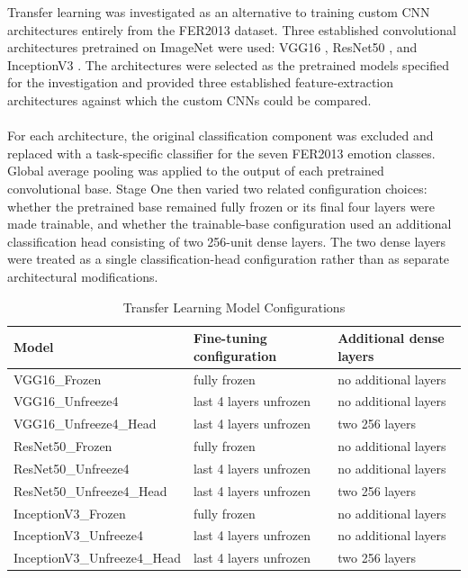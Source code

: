 \documentclass[12pt, a4paper]{report}
\begin{document}
			Transfer learning was investigated as an alternative to training custom CNN architectures entirely from the FER2013 dataset. Three established convolutional architectures pretrained on ImageNet were used: VGG16 \cite{simonyan2015vgg}, ResNet50 \cite{he2016resnet}, and InceptionV3 \cite{szegedy2016inception}. The architectures were selected as the pretrained models specified for the investigation and provided three established feature-extraction architectures against which the custom CNNs could be compared.\\\\
			For each architecture, the original classification component was excluded and replaced with a task-specific classifier for the seven FER2013 emotion classes. Global average pooling was applied to the output of each pretrained convolutional base. Stage One then varied two related configuration choices: whether the pretrained base remained fully frozen or its final four layers were made trainable, and whether the trainable-base configuration used an additional classification head consisting of two 256-unit dense layers. The two dense layers were treated as a single classification-head configuration rather than as separate architectural modifications.\\
				\begin{table}[h!]
					\centering
					\caption{Transfer Learning Model Configurations}
					\label{tab:tl_configurations}
					\begin{tabularx}{\textwidth}{lXX}
						\toprule
						Model & Fine-tuning configuration & Additional dense layers \\
						\midrule
						VGG16\_Frozen & fully frozen & no additional layers \\
						VGG16\_Unfreeze4 & last 4 layers unfrozen & no additional layers \\
						VGG16\_Unfreeze4\_Head & last 4 layers unfrozen & two 256 layers \\
						ResNet50\_Frozen & fully frozen & no additional layers \\
						ResNet50\_Unfreeze4 & last 4 layers unfrozen & no additional layers \\
						ResNet50\_Unfreeze4\_Head & last 4 layers unfrozen & two 256 layers \\
						InceptionV3\_Frozen & fully frozen & no additional layers \\
						InceptionV3\_Unfreeze4 & last 4 layers unfrozen & no additional layers \\
						InceptionV3\_Unfreeze4\_Head & last 4 layers unfrozen & two 256 layers \\
						\bottomrule
					\end{tabularx}
				\end{table}\\
\end{document}
